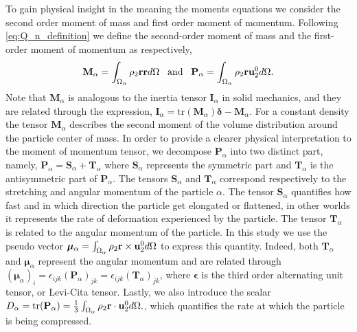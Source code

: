 To gain physical insight in the meaning the moments equations we consider the second order moment of mass and first order moment of momentum.
Following \ref{eq:Q_n_definition} we define the second-order moment of mass and the first-order moment of momentum as respectively,
\begin{equation}
    \textbf{M}_\alpha 
    = \int_{\Omega_\alpha}  \rho_2 \textbf{r} \textbf{r}  d\Omega
    \;\;\;\text{and}\;\;\;
    \textbf{P}_\alpha 
    = \int_{\Omega_\alpha}  \rho_2 \textbf{r} \textbf{u}_2^0  d\Omega.
    \label{eq:first_moment_of_momentum_def}
\end{equation}
Note that $\textbf{M}_\alpha$ is analogous to the inertia tensor $\textbf{I}_\alpha$ in solid mechanics, and they are related through the expression, $\textbf{I}_\alpha = \text{tr}(\textbf{M}_\alpha)\bm\delta - \textbf{M}_\alpha$.
For a constant density the tensor $\textbf{M}_\alpha$ describes the second moment of the volume distribution around the particle center of mass.
In order to provide a clearer physical interpretation to the moment of momentum tensor, we decompose $\textbf{P}_\alpha$ into two distinct part, namely,
$\textbf{P}_\alpha = \textbf{S}_\alpha+\textbf{T}_\alpha$ where $\textbf{S}_\alpha$ represents the symmetric part and $\textbf{T}_\alpha$ is the antisymmetric part of $\textbf{P}_\alpha$.
The tensors $\textbf{S}_\alpha$ and $\textbf{T}_\alpha$ correspond respectively to the stretching and angular momentum of the particle $\alpha$. 
The tensor $\textbf{S}_\alpha$ quantifies how fast and in which direction the particle get elongated or flattened, in other worlds it represents the rate of deformation experienced by the particle.
The tensor $\textbf{T}_\alpha$ is related to the angular momentum of the particle. 
In this study we use the pseudo vector $\bm{\mu}_\alpha = \int_{\Omega_\alpha}  \rho_2 \textbf{r} \times \textbf{u}_2^0  d\Omega$ to express this quantity. 
Indeed, both  $\textbf{T}_\alpha$ and $\bm{\mu}_\alpha$ represent the angular momentum and are related through $(\bm{\mu}_\alpha)_i = \epsilon_{ijk} (\textbf{P}_\alpha)_{jk}= \epsilon_{ijk} (\textbf{T}_\alpha)_{jk}$, where $\bm\epsilon$ is the third order alternating unit tensor, or Levi-Cita tensor. 
Lastly, we also introduce the scalar $D_\alpha = \text{tr}(\textbf{P}_\alpha) = \frac{1}{3}\int_{\Omega_\alpha}  \rho_2 \textbf{r} \cdot \textbf{u}_2^0  d\Omega.$, which quantifies the rate at which the particle is being compressed.

